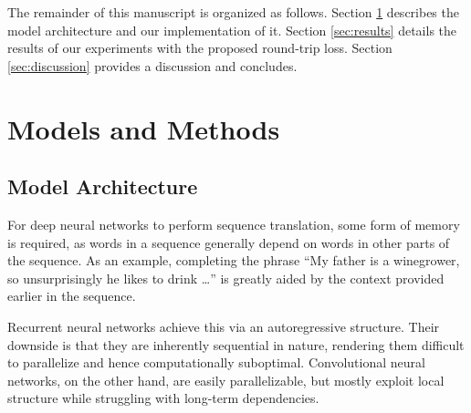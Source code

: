\documentclass[11pt,a4paper]{article}
\begin{document}
The remainder of this manuscript is organized as follows. Section \ref{sec:models} describes the model architecture and our implementation of it. Section \ref{sec:results} details the results of our experiments with the proposed round-trip loss. Section \ref{sec:discussion} provides a discussion and concludes.

\section{Models and Methods}\label{sec:models}
\subsection{Model Architecture}
For deep neural networks to perform sequence translation, some form of memory is required, as words in a sequence generally depend on words in other parts of the sequence. As an example, completing  the phrase ``My father is a winegrower, so unsurprisingly he likes to drink \ldots'' is greatly aided by the context provided earlier in the sequence.

Recurrent neural networks achieve this via an autoregressive structure. Their downside is that they are inherently sequential in nature, rendering them difficult to parallelize and hence computationally suboptimal.
Convolutional neural networks, on the other hand, are easily parallelizable, but mostly exploit local structure while struggling with long-term dependencies. 
\end{document}
